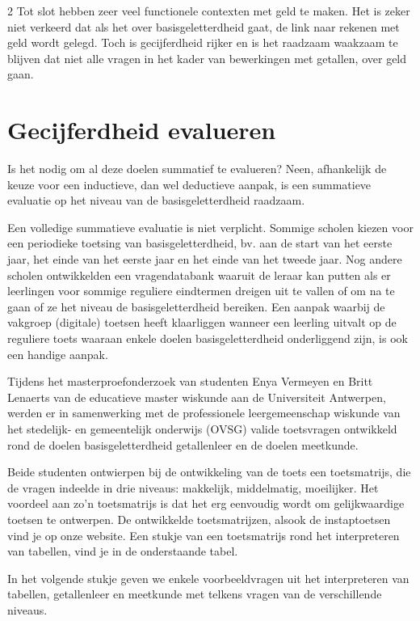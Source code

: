 \begin{multicols}{2}
Tot slot hebben zeer veel functionele contexten met geld te maken. Het is zeker niet verkeerd dat als het over basisgeletterdheid gaat, de link naar rekenen met geld wordt gelegd. Toch is gecijferdheid rijker en is het raadzaam waakzaam te blijven dat niet alle vragen in het kader van bewerkingen met getallen, over geld gaan.


\section{Gecijferdheid evalueren}
Is het nodig om al deze doelen summatief te evalueren? Neen, afhankelijk de keuze voor een inductieve, dan wel deductieve aanpak, is een summatieve evaluatie op het niveau van de basisgeletterdheid raadzaam. 

Een volledige summatieve evaluatie is niet verplicht. Sommige scholen kiezen voor een periodieke toetsing van basisgeletterdheid, bv. aan de start van het eerste jaar, het einde van het eerste jaar en het einde van het tweede jaar. Nog andere scholen ontwikkelden een vragendatabank waaruit de leraar kan putten als er leerlingen voor sommige reguliere eindtermen dreigen uit te vallen of om na te gaan of ze het niveau de basisgeletterdheid bereiken. Een aanpak waarbij de vakgroep (digitale) toetsen heeft klaarliggen wanneer een leerling uitvalt op de reguliere toets waaraan enkele doelen basisgeletterdheid onderliggend zijn, is ook een handige aanpak.

Tijdens het masterproefonderzoek van studenten Enya Vermeyen en Britt Lenaerts van de educatieve master wiskunde aan de Universiteit Antwerpen, werden er in samenwerking met de professionele leergemeenschap wiskunde van het stedelijk- en gemeentelijk onderwijs (OVSG) valide toetsvragen ontwikkeld rond de doelen basisgeletterdheid getallenleer en de doelen meetkunde. 

Beide studenten ontwierpen bij de ontwikkeling van de toets een toetsmatrijs, die de vragen indeelde in drie niveaus: makkelijk, middelmatig, moeilijker. Het voordeel aan zo'n toetsmatrijs is dat het erg eenvoudig wordt om gelijkwaardige toetsen te ontwerpen. De ontwikkelde toetsmatrijzen, alsook de instaptoetsen vind je op onze website. Een stukje van een toetsmatrijs rond het interpreteren van tabellen, vind je in de onderstaande tabel. 

In het volgende stukje geven we enkele voorbeeldvragen uit het interpreteren van tabellen, getallenleer en meetkunde met telkens vragen van de verschillende niveaus.
\end{multicols}
